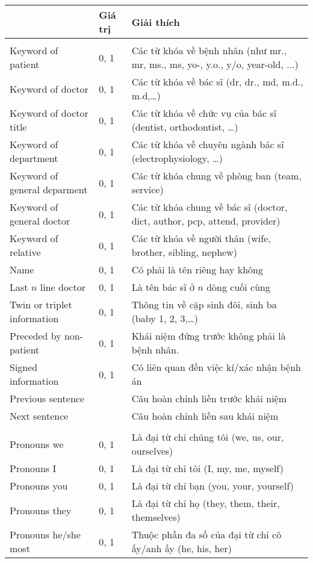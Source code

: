\begin{table}[t!]
\begin{tabularx}{\textwidth}{@{\hspace{1em}}P{\raggedright}{0.3}lL@{}}
\toprule 
{} & \textbf{Giá trị} & \textbf{Giải thích}\\
\midrule
{}\\
Keyword of patient & 0, 1 & Các từ khóa về bệnh nhân (như mr., mr, ms., ms, yo-, y.o., y/o, year-old, ...)\\
Keyword of doctor & 0, 1 & Các từ khóa về bác sĩ (dr, dr., md, m.d., m.d,…)\\
Keyword of doctor title & 0, 1 & Các từ khóa về chức vụ của bác sĩ (dentist, orthodontist, …)\\
Keyword of department  & 0, 1 & Các từ khóa về chuyên ngành bác sĩ (electrophysiology, …)\\
Keyword of general deparment & 0, 1 & Các từ khóa chung về phòng ban (team, service)\\
Keyword of general doctor & 0, 1 & Các từ khóa chung về bác sĩ (doctor, dict, author, pcp, attend, provider)\\
Keyword of relative & 0, 1 & Các từ khóa về người thân (wife, brother, sibling, nephew)\\
Name & 0, 1 & Có phải là tên riêng hay không\\
Last $n$ line doctor & 0, 1 & Là tên bác sĩ ở $n$ dòng cuối cùng\\
Twin or triplet information & 0, 1 & Thông tin về cặp sinh đôi, sinh ba (baby 1, 2, 3,…)\\
Preceded by non-patient & 0, 1 & Khái niệm đứng trước không phải là bệnh nhân.\\
Signed information  & 0, 1 & Có liên quan đến việc kí/xác nhận bệnh án\\
Previous sentence &  & Câu hoàn chỉnh liền trước khái niệm\\
Next sentence &  & Câu hoàn chỉnh liền sau khái niệm\\
\\
Pronouns we & 0, 1 & Là đại từ chỉ chúng tôi (we, us, our, ourselves)\\
Pronouns I & 0, 1 & Là đại từ chỉ tôi (I, my, me, myself)\\
Pronouns you & 0, 1 & Là đại từ chỉ bạn (you, your, yourself)\\
Pronouns they & 0, 1 & Là đại từ chỉ họ (they, them, their, themselves)\\
Pronouns he/she most & 0, 1 & Thuộc phần đa số của đại từ chỉ cô ấy/anh ấy (he, his, her)\\

\end{tabularx}
\end{table}
